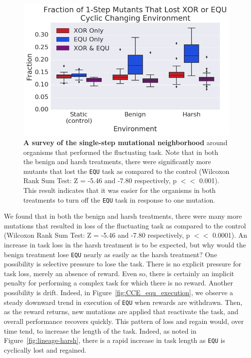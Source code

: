 \documentclass[10pt,letterpaper]{article}
\begin{document}
	\begin{figure}[!h] %
	\includegraphics[trim={0.2cm 0 0 0.2cm},clip,width=0.75\columnwidth]{figures/CE/CCE_frac_1step__box.png}
	\caption{\textbf{A survey of the single-step mutational neighborhood} around organisms that performed the fluctuating task. Note that in both the benign and harsh treatments, there were significantly more mutants that lost the \texttt{EQU} task as compared to the control (Wilcoxon Rank Sum Test: Z = -5.46 and -7.80 respectively, p $<<$ 0.001). This result indicates that it was easier for the organisms in both treatments to turn off the \texttt{EQU} task in response to one mutation. 
	}\label{fig:CCE_single_step}
	\end{figure}


We found that in both the benign and harsh treatments, there were many more mutations that resulted in loss of the fluctuating task as compared to the control (Wilcoxon Rank Sum Test: Z = -5.46 and -7.80 respectively, p $<<$ 0.0001). An increase in task loss in the harsh treatment is to be expected, but why would the benign treatment lose \texttt{EQU} nearly as easily as the harsh treatment? One possibility is selective pressure to lose the task. There is no explicit pressure for task loss, merely an absence of reward. Even so, there is certainly an implicit penalty for performing a complex task for which there is no reward. Another possibility is drift. Indeed, in Figure~\ref{fig:CCE_equ_execution}, we observe a steady downward trend in execution of \texttt{EQU} when rewards are withdrawn. Then, as the reward returns, new mutations are applied that reactivate the task, and overall performance recovers quickly. This pattern of loss and regain would, over time tend, to increase the length of the task. Indeed, as noted in Figure~\ref{fig:lineage-harsh}, there is a rapid increase in task length as \texttt{EQU} is cyclically lost and regained. 
\end{document}
